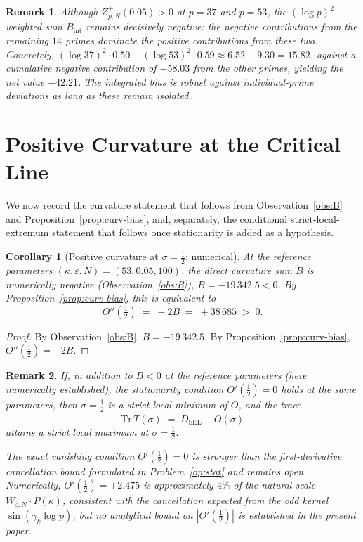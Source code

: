 \documentclass[11pt]{article}
\newtheorem{corollary}[theorem]{Corollary}
\newtheorem*{remark}{Remark}
\newcommand{\Tt}{\widetilde{T}}
\newcommand{\DSEL}{D_{\mathrm{SEL}}}
\begin{document}
\begin{remark}
Although $Z_{p,N}^+(0.05)>0$ at $p=37$ and $p=53$, the
$(\log p)^2$-weighted sum $B_{\mathrm{int}}$ remains decisively
negative: the negative contributions from the remaining $14$ primes
dominate the positive contributions from these two.
Concretely, $(\log 37)^2\cdot 0.50+(\log 53)^2\cdot 0.59\approx
6.52+9.30=15.82$, against a cumulative negative contribution of
$-58.03$ from the other primes, yielding the net value $-42.21$.
The integrated bias is robust against individual-prime deviations as
long as these remain isolated.
\end{remark}

\section{Positive Curvature at the Critical Line}
\label{sec:curvcor}

We now record the curvature statement that follows from
Observation~\ref{obs:B} and Proposition~\ref{prop:curv-bias}, and,
separately, the conditional strict-local-extremum statement that
follows once stationarity is added as a hypothesis.

\begin{corollary}[Positive curvature at $\sigma=\tfrac12$; numerical]
\label{cor:curvature}
At the reference parameters $(\kappa,\varepsilon,N)=(53,0.05,100)$,
the direct curvature sum $B$ is numerically negative
(Observation~\ref{obs:B}), $B=-19\,342.5<0$.
By Proposition~\ref{prop:curv-bias}, this is equivalent to
\[
O''(\tfrac12) \;=\; -2B \;=\; +38\,685 \;>\; 0.
\]
\end{corollary}

\begin{proof}
By Observation~\ref{obs:B}, $B=-19\,342.5$.
By Proposition~\ref{prop:curv-bias}, $O''(\tfrac12)=-2B$.
\end{proof}

\begin{remark}
If, in addition to $B<0$ at the reference parameters (here numerically
established), the stationarity condition $O'(\tfrac12)=0$ holds at the
same parameters, then $\sigma=\tfrac12$ is a strict local minimum of
$O$, and the trace
\[
\mathrm{Tr}\,\Tt(\sigma) \;=\; \DSEL - O(\sigma)
\]
attains a strict local maximum at $\sigma=\tfrac12$.

The exact vanishing condition $O'(\tfrac12)=0$ is stronger than the
first-derivative cancellation bound formulated in Problem~\ref{op:stat}
and remains open.
Numerically, $O'(\tfrac12)=+2.475$ is approximately $4\%$ of the
natural scale $W_{\varepsilon,N}\cdot P(\kappa)$, consistent with the cancellation expected
from the odd kernel $\sin(\gamma_k\log p)$, but no analytical bound on
$|O'(\tfrac12)|$ is established in the present paper.
\end{remark}
\end{document}
